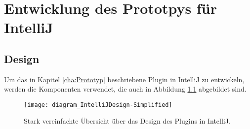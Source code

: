 \chapter{Entwicklung des Prototpys für IntelliJ}
\label{cha:EntwicklungIntelliJ}

\section{Design}
\label{sec:EntwicklungIntelliJ_Design}

Um das in Kapitel \ref{cha:Prototyp} beschriebene Plugin in IntelliJ
zu entwickeln, werden die Komponenten verwendet, die auch in 
Abbildung \ref{fig:diagram_IntelliJDesign-Simplified} abgebildet sind.

\begin{figure}
    \centering
    \texttt{[image: diagram\_IntelliJDesign-Simplified]}
    \caption{Stark vereinfachte Übersicht über das Design des Plugins in IntelliJ.}
    \label{fig:diagram_IntelliJDesign-Simplified}
\end{figure}


